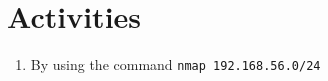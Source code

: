 \section*{Activities}
\begin{enumerate}
    \item By using the command \texttt{nmap 192.168.56.0/24}
\end{enumerate}
